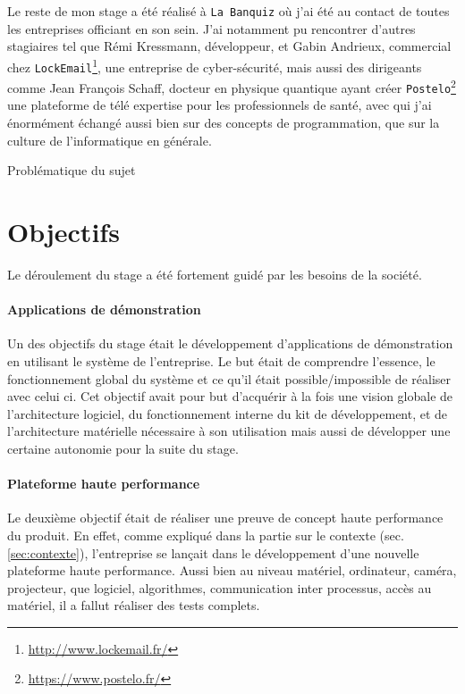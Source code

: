 Le reste de mon stage a été réalisé à \texttt{La Banquiz} où j'ai été au contact de toutes les entreprises officiant en son sein. J'ai notamment pu rencontrer d'autres stagiaires tel que Rémi Kressmann, développeur, et Gabin Andrieux, commercial chez \texttt{LockEmail}\footnote{\href{http://www.lockemail.fr/}{http://www.lockemail.fr/}}, une entreprise de cyber-sécurité, mais aussi des dirigeants comme Jean François Schaff, docteur en physique quantique ayant créer \texttt{Postelo}\footnote{\href{https://www.postelo.fr/}{https://www.postelo.fr/}} une plateforme de télé expertise pour les professionnels de santé, avec qui j'ai énormément échangé aussi bien sur des concepts de programmation, que sur la culture de l'informatique en générale.

\begin{center}
Problématique du sujet
\end{center}

\section{Objectifs}
Le déroulement du stage a été fortement guidé par les besoins de la société.

\paragraph{Applications de démonstration} Un des objectifs du stage était le développement d'applications de démonstration en utilisant le système de l'entreprise. Le but était de comprendre l'essence, le fonctionnement global du système et ce qu'il était possible/impossible de réaliser avec celui ci. Cet objectif avait pour but d'acquérir à la fois une vision globale de l'architecture logiciel, du fonctionnement interne du kit de développement, et de l'architecture matérielle nécessaire à son utilisation mais aussi de développer une certaine autonomie pour la suite du stage.

\paragraph{Plateforme haute performance} Le deuxième objectif était de réaliser une preuve de concept haute performance du produit. En effet, comme expliqué dans la partie sur le contexte (sec. \ref{sec:contexte}), l'entreprise se lançait dans le développement d'une nouvelle plateforme haute performance. Aussi bien au niveau matériel, ordinateur, caméra, projecteur, que logiciel, algorithmes, communication inter processus, accès au matériel, il a fallut réaliser des tests complets.


